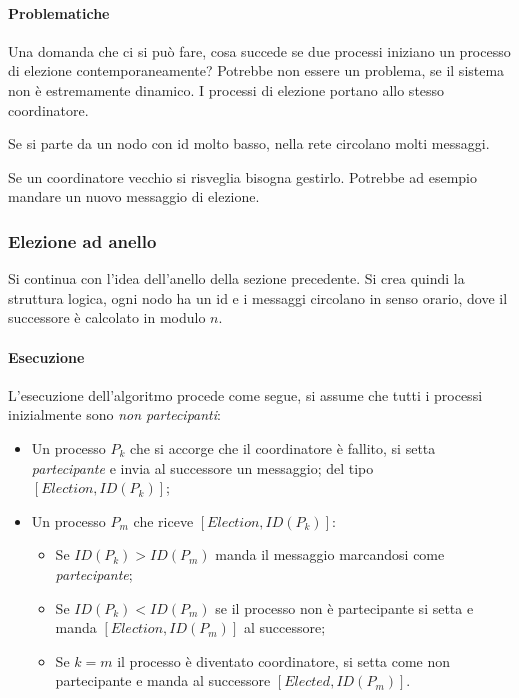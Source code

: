 \paragraph{Problematiche}
Una domanda che ci si può fare, cosa succede se due processi 
iniziano un processo di elezione contemporaneamente?
Potrebbe non essere un problema, se il sistema non è estremamente 
dinamico. I processi di elezione portano allo stesso coordinatore.

Se si parte da un nodo con id molto basso, nella rete circolano 
molti messaggi.

Se un coordinatore vecchio si risveglia bisogna gestirlo. Potrebbe ad 
esempio mandare un nuovo messaggio di elezione.

\subsubsection{Elezione ad anello}

Si continua con l'idea dell'anello della sezione precedente.
Si crea quindi la struttura logica, ogni nodo ha un id e i messaggi 
circolano in senso orario, dove il successore è calcolato in modulo 
$n$.

\paragraph{Esecuzione}
L'esecuzione dell'algoritmo procede come segue, si assume che 
tutti i processi inizialmente sono \emph{non partecipanti}:
\begin{itemize}
    \item Un processo $P_k$ che si accorge che il coordinatore è fallito, 
    si setta \emph{partecipante} e invia al successore un messaggio;
    del tipo $[\mathit{Election}, \mathit{ID}(P_k)]$;
    \item Un processo $P_m$ che riceve $[\mathit{Election}, \mathit{ID}(P_k)]$:
    \begin{itemize}
        \item Se $\mathit{ID}(P_k) > \mathit{ID}(P_m)$ manda il messaggio 
        marcandosi come \emph{partecipante};
        \item Se $\mathit{ID}(P_k) < \mathit{ID}(P_m)$ se il processo 
        non è partecipante si setta e manda $[\mathit{Election}, \mathit{ID}(P_m)]$
        al successore;
        \item Se $k = m$ il processo è diventato coordinatore, si setta 
        come non partecipante e manda al successore $[\mathit{Elected}, \mathit{ID}(P_m)]$.
    \end{itemize}
\end{itemize}

